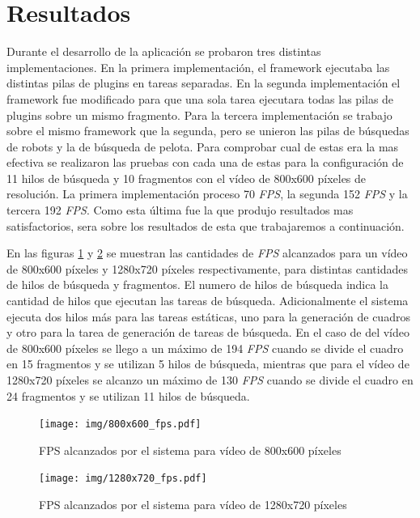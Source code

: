 \section{Resultados}

Durante el desarrollo de la aplicación se probaron tres distintas
implementaciones. En la primera implementación, el framework ejecutaba las
distintas pilas de plugins en tareas separadas. En la segunda implementación el
framework fue modificado para que una sola tarea ejecutara todas las pilas de
plugins sobre un mismo fragmento. Para la tercera implementación se trabajo
sobre el mismo framework que la segunda, pero se unieron las pilas de búsquedas
de robots y la de búsqueda de pelota. Para comprobar cual de estas era la mas
efectiva se realizaron las pruebas con cada una de estas para la configuración
de 11 hilos de búsqueda y 10 fragmentos con el vídeo de 800x600 píxeles de
resolución. La primera implementación proceso 70 \emph{FPS}, la segunda 152
\emph{FPS} y la tercera 192 \emph{FPS}. Como esta última fue la que produjo
resultados mas satisfactorios, sera sobre los resultados de esta que
trabajaremos a continuación.

En las figuras \ref{800fps} y \ref{1280fps} se muestran las cantidades de
\emph{FPS} alcanzados para un vídeo de 800x600 píxeles y 1280x720 píxeles
respectivamente, para distintas cantidades de hilos de búsqueda y fragmentos.
El numero de hilos de búsqueda indica la cantidad de hilos que ejecutan las
tareas de búsqueda. Adicionalmente el sistema ejecuta dos hilos más para las
tareas estáticas, uno para la generación de cuadros y otro para la tarea de
generación de tareas de búsqueda. En el caso de del vídeo de 800x600 píxeles se
llego a un máximo de 194 \emph{FPS} cuando se divide el cuadro en 15 fragmentos
y se utilizan 5 hilos de búsqueda, mientras que para el vídeo de 1280x720
píxeles se alcanzo un máximo de 130 \emph{FPS} cuando se divide el cuadro en 24
fragmentos y se utilizan 11 hilos de búsqueda.

\begin{figure}[!h]

	\texttt{[image: img/800x600\_fps.pdf]}
	\caption{FPS alcanzados por el sistema para vídeo de 800x600 píxeles}
	\label{800fps}

\end{figure}

\begin{figure}[!h]

	\texttt{[image: img/1280x720\_fps.pdf]}
	\caption{FPS alcanzados por el sistema para vídeo de 1280x720 píxeles}
	\label{1280fps}

\end{figure}

